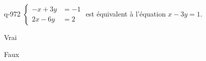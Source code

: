 \begin{truefalse}{q-972}
$\begin{cases}-x+3y &= -1 \\ 2x-6y &= 2\end{cases}$ est équivalent à l'équation $x-3y = 1$.
\item* Vrai
\item Faux
\end{truefalse}

